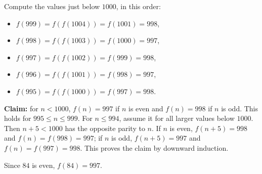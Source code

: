 Compute the values just below $1000$, in this order:
\begin{itemize}
\item $f(999)=f(f(1004))=f(1001)=998$,
\item $f(998)=f(f(1003))=f(1000)=997$,
\item $f(997)=f(f(1002))=f(999)=998$,
\item $f(996)=f(f(1001))=f(998)=997$,
\item $f(995)=f(f(1000))=f(997)=998$.
\end{itemize}
\textbf{Claim:} for $n<1000$, $f(n)=997$ if $n$ is even and $f(n)=998$ if $n$ is odd. This holds for $995\le n\le999$. For $n\le994$, assume it for all larger values below $1000$. Then $n+5<1000$ has the opposite parity to $n$. If $n$ is even, $f(n+5)=998$ and $f(n)=f(998)=997$; if $n$ is odd, $f(n+5)=997$ and $f(n)=f(997)=998$. This proves the claim by downward induction.

Since $84$ is even, $f(84)=\boxed{997}$.
